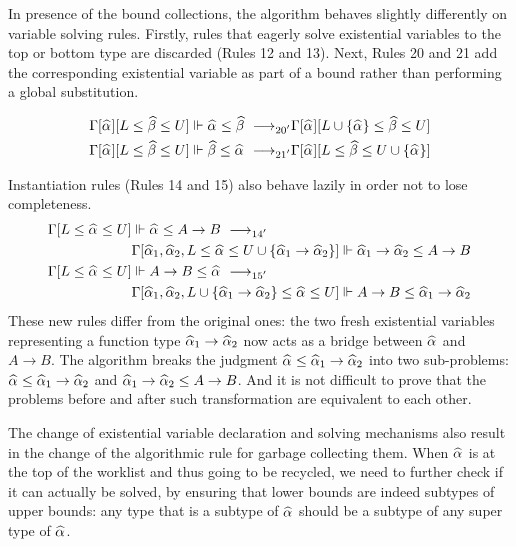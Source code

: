 In presence of the bound collections, the algorithm behaves slightly differently
on variable solving rules.
Firstly, rules that eagerly solve existential variables to the top or bottom type
are discarded (Rules 12 and 13).
Next, Rules 20 and 21 add the corresponding existential variable
as part of a bound rather than performing a global substitution.

\begin{gather*}
    \begin{aligned}
\Gm[\al][L \le \bt \le U] \Vdash \al \le \bt &\rrule{20'}
    \Gm[\al][L \cup \{\al\} \le \bt \le U]\\
\Gm[\al][L \le \bt \le U] \Vdash \bt \le \al &\rrule{21'}
    \Gm[\al][L \le \bt \le U \cup \{\al\}]\\
    \end{aligned}
\end{gather*}

Instantiation rules (Rules 14 and 15) also behave lazily in order not to lose completeness.
\begin{gather*}
    \begin{aligned}
\Gm[L \le \al \le U] &\Vdash \al \le A \to B \rrule{14'}\\
    & \Gm[\al[1], \al[2], L \le \al \le U \cup \{\al[1] \to \al[2]\}] \Vdash \al[1] \to \al[2] \le A \to B\\
\Gm[L \le \al \le U] &\Vdash A \to B \le \al \rrule{15'}\\
    & \Gm[\al[1], \al[2], L \cup \{\al[1] \to \al[2]\} \le \al \le U] \Vdash A \to B \le \al[1] \to \al[2]\\
    \end{aligned}
\end{gather*}
These new rules differ from the original ones:
the two fresh existential variables representing a function type $\al[1] \to \al[2]$
now acts as a bridge between $\al$ and $A \to B$.
The algorithm breaks the judgment $\al \le \al[1] \to \al[2]$ into two sub-problems:
$\al \le \al[1] \to \al[2]$ and $\al[1] \to \al[2] \le A \to B$.
And it is not difficult to prove that the problems before and after
such transformation are equivalent to each other.

The change of existential variable declaration and solving mechanisms
also result in the change of
the algorithmic rule for garbage collecting them.
When $\al$ is at the top of the worklist and thus going to be recycled,
we need to further check if it can actually be solved,
by ensuring that lower bounds are indeed subtypes of upper bounds:
any type that is a subtype of $\al$ should be a subtype of
any super type of $\al$.

